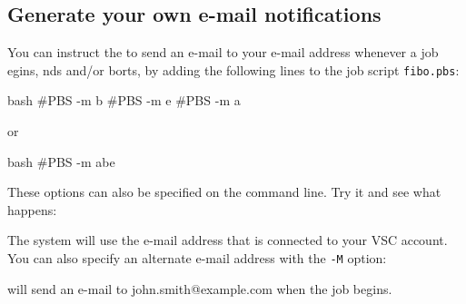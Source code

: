 \subsection{Generate your own e-mail notifications}

You can instruct the \hpc to send an e-mail to your e-mail address whenever a
job egins, nds and/or borts, by adding the
following lines to the job script \lstinline|fibo.pbs|:

\begin{code}{bash}
#PBS -m b
#PBS -m e
#PBS -m a
\end{code}
or
\begin{code}{bash}
#PBS -m abe
\end{code}

These options can also be specified on the command line.  Try it and see what
happens:

\begin{prompt}
\end{prompt}

The system will use the e-mail address that is connected to your VSC account.
You can also specify an alternate e-mail address with the \lstinline|-M| option:

\begin{prompt}
\end{prompt}

will send an e-mail to john.smith@example.com when the job begins.
